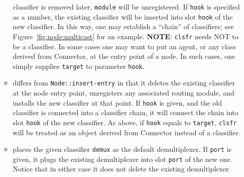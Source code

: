 \begin{itemize}
\begin{itemize}
    classifier is removed later, {\tt module} will be unregistered.
    If {\tt hook} is specified as a number, the existing classifier
    will be inserted into slot {\tt hook} of the new classifier. 
    In this way, one may establish a ``chain'' of classifiers; see
    Figure~\ref{fig:node:multicast} for an example.
    {\bf NOTE}: {\tt clsfr} needs NOT to be a classifier. In some
    cases one may want to put an agent, or any class derived from
    Connector, at the entry point of a node. In such cases, one simply
    supplies {\tt target} to parameter {\tt hook}.
  \item {} differs from
    {\tt Node::insert-entry} in that it deletes the existing
    classifier at the node entry point, unregisters any associated
    routing module, and installs the new classifier at that point. 
    If {\tt hook} is given, and the old classifier is connected into
    a classifier chain, it will connect the chain into slot
    {\tt hook} of the new classifier. 
    As above, if {\tt hook} equals to {\tt target}, {\tt clsfr}
    will be treated as an object derived from Connector instead of a
    classifier. 
  \item {} places the given
    classifier {\tt demux} as the default demultiplexer. If
    {\tt port} is given, it plugs the existing demultiplexer into
    slot {\tt port} of the new one. Notice that in either case it does
    not delete the existing demultiplexer.
  \end{itemize}
\end{itemize}

